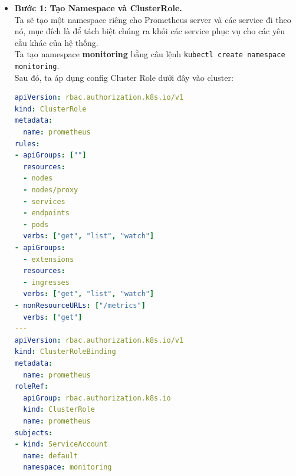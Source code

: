 \begin{itemize}
  \item \textbf{Bước 1: Tạo Namespace và ClusterRole.}\\[0.2cm]
  Ta sẽ tạo một namespace riêng cho Prometheus server và các service đi theo nó, mục đích là để tách biệt chúng ra khỏi các service phục vụ cho các yêu cầu khác của hệ thống.\\[0.2cm]
  Ta tạo namespace \textbf{monitoring} bằng câu lệnh \lstinline|kubectl create namespace monitoring|.\\[0.2cm]
  Sau đó, ta áp dụng config Cluster Role dưới đây vào cluster:
  \begin{lstlisting}[language=yaml]
apiVersion: rbac.authorization.k8s.io/v1
kind: ClusterRole
metadata:
  name: prometheus
rules:
- apiGroups: [""]
  resources:
  - nodes
  - nodes/proxy
  - services
  - endpoints
  - pods
  verbs: ["get", "list", "watch"]
- apiGroups:
  - extensions
  resources:
  - ingresses
  verbs: ["get", "list", "watch"]
- nonResourceURLs: ["/metrics"]
  verbs: ["get"]
---
apiVersion: rbac.authorization.k8s.io/v1
kind: ClusterRoleBinding
metadata:
  name: prometheus
roleRef:
  apiGroup: rbac.authorization.k8s.io
  kind: ClusterRole
  name: prometheus
subjects:
- kind: ServiceAccount
  name: default
  namespace: monitoring


\end{lstlisting}
\end{itemize}
